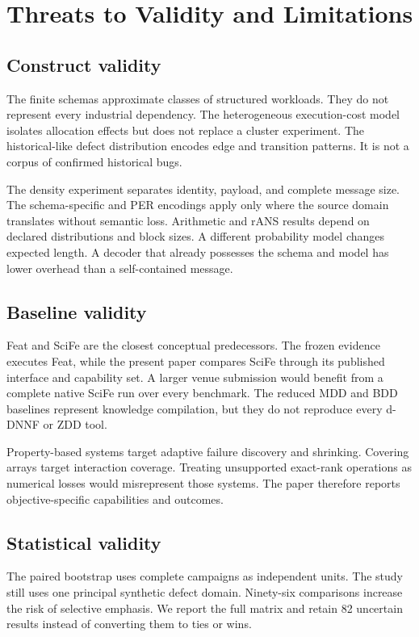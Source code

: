 \section{Threats to Validity and Limitations}\label{sec:limitations}
\subsection{Construct validity}
The finite schemas approximate classes of structured workloads. They do not represent every industrial dependency. The heterogeneous execution-cost model isolates allocation effects but does not replace a cluster experiment. The historical-like defect distribution encodes edge and transition patterns. It is not a corpus of confirmed historical bugs.

The density experiment separates identity, payload, and complete message size. The schema-specific and PER encodings apply only where the source domain translates without semantic loss. Arithmetic and rANS results depend on declared distributions and block sizes. A different probability model changes expected length. A decoder that already possesses the schema and model has lower overhead than a self-contained message.

\subsection{Baseline validity}
Feat and SciFe are the closest conceptual predecessors. The frozen evidence executes Feat, while the present paper compares SciFe through its published interface and capability set. A larger venue submission would benefit from a complete native SciFe run over every benchmark. The reduced MDD and BDD baselines represent knowledge compilation, but they do not reproduce every d-DNNF or ZDD tool.

Property-based systems target adaptive failure discovery and shrinking. Covering arrays target interaction coverage. Treating unsupported exact-rank operations as numerical losses would misrepresent those systems. The paper therefore reports objective-specific capabilities and outcomes.

\subsection{Statistical validity}
The paired bootstrap uses complete campaigns as independent units. The study still uses one principal synthetic defect domain. Ninety-six comparisons increase the risk of selective emphasis. We report the full matrix and retain 82 uncertain results instead of converting them to ties or wins.

